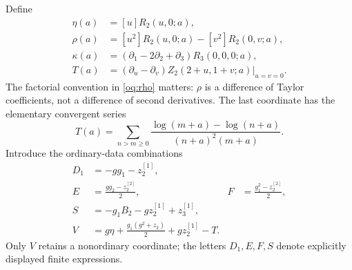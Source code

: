 Define
\begin{align}
 \eta(a)&=[u]R_2(u,0;a),\label{oq:eta}\\
 \rho(a)&=[u^2]R_2(u,0;a)-[v^2]R_2(0,v;a),\label{oq:rho}\\
 \kappa(a)&=(\partial_1-2\partial_2+\partial_3)R_3(0,0,0;a),
 \label{oq:kappa}\\
 T(a)&=(\partial_u-\partial_v)Z_2(2+u,1+v;a)\big|_{u=v=0}.
 \label{oq:T}
\end{align}
The factorial convention in \eqref{oq:rho} matters: $\rho$ is a
difference of Taylor coefficients, not a difference of second derivatives.
The last coordinate has the elementary convergent series
\begin{equation}\label{oq:Tseries}
 T(a)=\sum_{n>m\ge0}
 \frac{\log(m+a)-\log(n+a)}{(n+a)^2(m+a)}.
\end{equation}
Introduce the ordinary-data combinations
\begin{align}
 D_1&=-gg_1-z_2^{[1]},\label{oq:D1}\\
 E&=\frac{gg_2-z_2^{[2]}}2,
 &F&=\frac{g_1^2-z_2^{[2]}}2,\label{oq:EF}\\
 S&=-g_1B_2-gz_2^{[1]}+z_3^{[1]},\label{oq:S}\\
 V&=g\eta+\frac{g_1(g^2+z_2)}2+gz_2^{[1]}-T.
 \label{oq:V}
\end{align}
Only $V$ retains a nonordinary coordinate; the letters $D_1,E,F,S$
denote explicitly displayed finite expressions.

